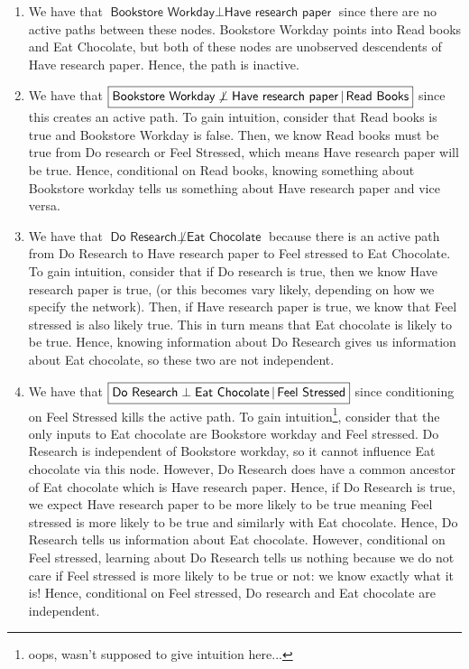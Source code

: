 \documentclass[submit]{harvardml}
\newcommand{\attr}[1]{\textsf{#1}}
\begin{document}
\begin{enumerate}
\item We have that $\boxed{\attr{Bookstore Workday} \perp \attr{Have research paper}}$ since there are no active paths between these nodes. \attr{Bookstore Workday} points into \attr{Read books} and \attr{Eat Chocolate}, but both of these nodes are unobserved descendents of \attr{Have research paper}. Hence, the path is inactive.

\item We have that $\boxed{\attr{Bookstore Workday} \not\perp \attr{Have research
  paper}\given \attr{Read Books}}$ since this creates an active path. To gain intuition, consider that \attr{Read books} is true and \attr{Bookstore Workday} is false. Then, we know \attr{Read books} must be true from \attr{Do research} or \attr{Feel Stressed}, which means \attr{Have research
  paper} will be true. Hence, conditional on \attr{Read books}, knowing something about \attr{Bookstore workday} tells us something about \attr{Have research paper} and vice versa.

\item We have that $\boxed{\attr{Do Research} \not\perp \attr{Eat Chocolate}}$ because there is an active path from \attr{Do Research} to \attr{Have research paper} to \attr{Feel stressed} to \attr{Eat Chocolate}. To gain intuition, consider that if \attr{Do research} is true, then we know \attr{Have research paper} is true, (or this becomes vary likely, depending on how we specify the network). Then, if \attr{Have research paper} is true, we know that \attr{Feel stressed} is also likely true. This in turn means that \attr{Eat chocolate} is likely to be true. Hence, knowing information about \attr{Do Research} gives us information about \attr{Eat chocolate}, so these two are not independent.

\item We have that $\boxed{\attr{Do Research} \perp \attr{Eat Chocolate} \given
  \attr{Feel Stressed}}$ since conditioning on \attr{Feel Stressed} kills the active path. To gain intuition\footnote{oops, wasn't supposed to give intuition here...}, consider that the only inputs to  \attr{Eat chocolate} are \attr{Bookstore workday} and  \attr{Feel stressed}.  \attr{Do Research} is independent of  \attr{Bookstore workday}, so it cannot influence  \attr{Eat chocolate} via this node. However, \attr{Do Research} does have a common ancestor of \attr{Eat chocolate} which is \attr{Have research paper}. Hence, if \attr{Do Research} is true, we expect \attr{Have research paper} to be more likely to be true meaning \attr{Feel stressed} is more likely to be true and similarly with \attr{Eat chocolate}. Hence,  \attr{Do Research} tells us information about \attr{Eat chocolate}. However, conditional on \attr{Feel stressed}, learning about \attr{Do Research} tells us nothing because we do not care if \attr{Feel stressed} is more likely to be true or not: we know exactly what it is! Hence, conditional on \attr{Feel stressed}, \attr{Do research} and \attr{Eat chocolate} are independent.


\end{enumerate}
\end{document}
